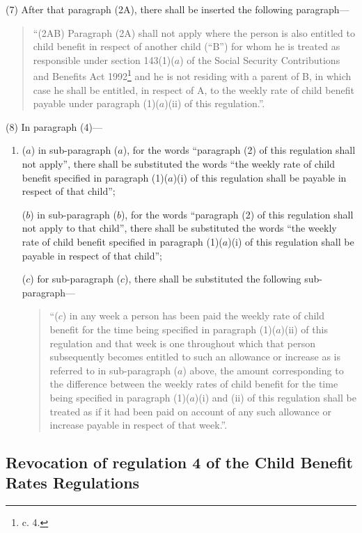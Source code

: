 \documentclass[12pt,a4paper]{article}
\begin{document}
(7) After that paragraph (2A), there shall be inserted the following paragraph—
\begin{quotation}
“(2AB) Paragraph (2A) shall not apply where the person is also entitled to child benefit in respect of another child (“B”) for whom he is treated as responsible under section 143(1)($a$) of the Social Security Contributions and Benefits Act 1992\footnote{ c. 4.} and he is not residing with a parent of B, in which case he shall be entitled, in respect of A, to the weekly rate of child benefit payable under paragraph (1)($a$)(ii) of this regulation.”.
\end{quotation}

(8) In paragraph (4)—
\begin{enumerate}\item[]
($a$) in sub-paragraph ($a$), for the words “paragraph (2) of this regulation shall not apply”, there shall be substituted the words “the weekly rate of child benefit specified in paragraph (1)($a$)(i) of this regulation shall be payable in respect of that child”;

($b$) in sub-paragraph ($b$), for the words “paragraph (2) of this regulation shall not apply to that child”, there shall be substituted the words “the weekly rate of child benefit specified in paragraph (1)($a$)(i) of this regulation shall be payable in respect of that child”;

($c$) for sub-paragraph ($c$), there shall be substituted the following sub-paragraph—
\begin{quotation}
“($c$) in any week a person has been paid the weekly rate of child benefit for the time being specified in paragraph (1)($a$)(ii) of this regulation and that week is one throughout which that person subsequently becomes entitled to such an allowance or increase as is referred to in sub-paragraph ($a$) above, the amount corresponding to the difference between the weekly rates of child benefit for the time being specified in paragraph (1)($a$)(i) and (ii) of this regulation shall be treated as if it had been paid on account of any such allowance or increase payable in respect of that week.”.
\end{quotation}
\end{enumerate}

\subsection[6. Revocation of regulation 4 of the Child Benefit Rates Regulations]{Revocation of regulation 4 of the Child Benefit Rates Regulations}
\end{document}
